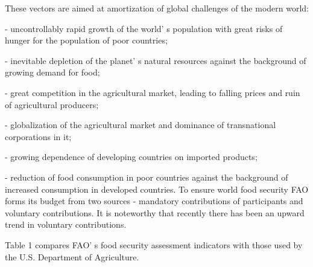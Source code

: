 \begin{multicols}{2}
These vectors are aimed at amortization of global challenges of the
modern world:

- uncontrollably rapid growth of the world' s population
with great risks of hunger for the population of poor countries;

- inevitable depletion of the planet' s natural resources
against the background of growing demand for food;

- great competition in the agricultural market, leading to falling
prices and ruin of agricultural producers;

- globalization of the agricultural market and dominance of
transnational corporations in it;

- growing dependence of developing countries on imported products;

- reduction of food consumption in poor countries against the background
of increased consumption in developed countries. To ensure world food
security FAO forms its budget from two sources - mandatory contributions
of participants and voluntary contributions. It is noteworthy that
recently there has been an upward trend in voluntary contributions.

Table 1 compares FAO' s food security assessment
indicators with those used by the U.S. Department of Agriculture.
\end{multicols}

